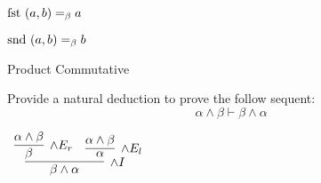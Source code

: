 \documentclass{book}
\begin{document}
        \begin{center}
          $\text{fst} \ (a,b) =_{\beta} a$ 
      
          $\text{snd} \ (a,b) =_{\beta} b$ 
        \end{center}
      
        \begin{eg}{Product Commutative}

            Provide a natural deduction to prove the follow sequent: $$ \alpha \land \beta \vdash \beta \land \alpha $$
    
            \begin{center}
                $\begin{array}{c}
                    \infer[\land I]{\beta \land \alpha}
                        {\infer[\land E_{r}]{\beta}
                            {\alpha \land \beta}
                        &
                        \infer[\land E_{l}]{\alpha}
                            {\alpha \land \beta}}
                \end{array}$
            \end{center}
            
        \end{eg}
    
\end{document}
